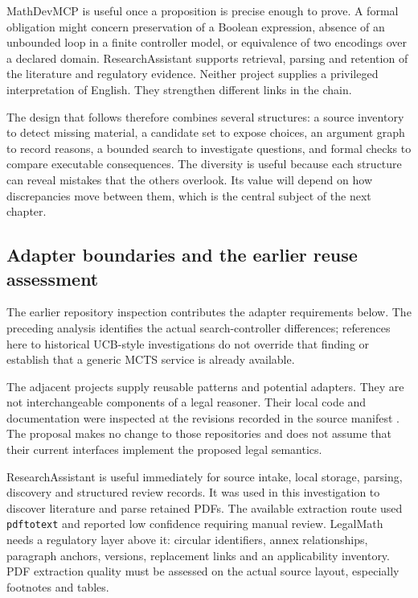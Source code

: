 
MathDevMCP is useful once a proposition is precise enough to prove. A formal
obligation might concern preservation of a Boolean expression, absence of an
unbounded loop in a finite controller model, or equivalence of two encodings over
a declared domain. ResearchAssistant supports retrieval, parsing and retention
of the literature and regulatory evidence. Neither project supplies a privileged
interpretation of English. They strengthen different links in the chain.

The design that follows therefore combines several structures: a source inventory
to detect missing material, a candidate set to expose choices, an argument graph
to record reasons, a bounded search to investigate questions, and formal checks
to compare executable consequences. The diversity is useful because each
structure can reveal mistakes that the others overlook. Its value will depend on
how discrepancies move between them, which is the central subject of the next
chapter.

\subsection{Adapter boundaries and the earlier reuse assessment}

The earlier repository inspection contributes the adapter requirements below.
The preceding analysis identifies the actual search-controller differences;
references here to historical UCB-style investigations do not override that
finding or establish that a generic MCTS service is already available.


\label{merge:P-04-prototype:03}


The adjacent projects supply reusable patterns and potential adapters. They are
not interchangeable components of a legal reasoner. Their local code and
documentation were inspected at the revisions recorded in the source manifest
\citep{localrepos}. The proposal makes no change to those repositories and does
not assume that their current interfaces implement the proposed legal semantics.

ResearchAssistant is useful immediately for source intake, local storage, parsing,
discovery and structured review records. It was used in this investigation to
discover literature and parse retained PDFs. The available extraction route used
\texttt{pdftotext} and reported low confidence requiring manual review. LegalMath
needs a regulatory layer above it: circular identifiers, annex relationships,
paragraph anchors, versions, replacement links and an applicability inventory.
PDF extraction quality must be assessed on the actual source layout, especially
footnotes and tables.

